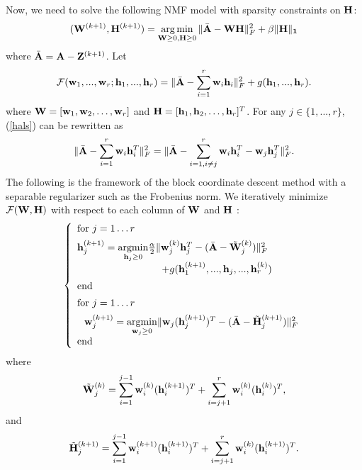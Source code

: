 Now, we need to solve the following NMF model with sparsity constraints on ${\bf H}$:
$$
({\bf W}^{(k+1)},{\bf H}^{(k+1)}) = \mathop{\rm arg\,min}_{{\bf W} \ge 0, {\bf H} \ge 0}  \|\bar{\bf A} - {\bf W}{\bf H}\|_F^2 + \beta \|\bf H\|_1
$$
where $\bar{\bf A} = {\bf A} - {\bf Z}^{(k+1)}$. Let
\begin{equation}\label{hals}
{\cal F}({\bf w}_1,...,{\bf w}_r;{\bf h}_1,...,{\bf h}_r) = \norm{\bar{\bf A} - \sum_{i=1}^r {\bf w}_i{\bf h}_i}_F^2 + g({\bf h}_1,...,{\bf h}_r).
\end{equation}
where ${\bf W} = [{\bf w}_1,{\bf w}_2,\dots,{\bf w}_r]$ and ${\bf H} = [{\bf h}_1, {\bf h}_2, \dots, {\bf h}_r]^T$. For any $j \in \{1,...,r\}$, (\ref{hals}) can be rewritten as
\begin{equation}\label{hals-1}
\|\bar{{\bf A}}-\sum_{i=1}^r{\bf w}_i{\bf h}_i^T\|^2_F=\|\bar{\bf A}-\sum_{i=1,i\not=j}^r {\bf w}_i{\bf h}_i^T-{\bf w}_j{\bf h}_j^T\|^2_F.
\end{equation}
The following is the framework of the  block coordinate descent
method with a separable regularizer such as the  Frobenius norm. We
iteratively minimize ${\cal F}({\bf W},{\bf H})$ with respect to
each column of ${\bf W}$ and ${\bf H}$ :
\begin{equation}
\left\{
  \begin{array}{ll}
  {\rm for}\ j=1 \dots r \\[5pt]
  {\bf h}_j^{(k+1)} = \underset{{\bf h}_j \ge 0}{\rm argmin} \frac{\alpha}{2}\norm{{\bf w}_j^{(k)}{\bf h}_j^T-(\bar{\bf A}-\tilde{\bf W}^{(k)}_j)}^2_F\\\hspace{3cm} + g({\bf h}_1^{(k+1)},...,{\bf h}_j,...,{\bf h}_r^{(k)}) \\[5pt]
  {\rm end}\\[5pt]
    {\rm for}\ j=1 \dots r \\[5pt]
  \hspace{0.25cm}{\bf w}_j^{(k+1)} = \underset{{\bf w}_j \ge 0}{\rm argmin} \norm{{\bf w}_j ({\bf h}_j^{(k+1)})^T -(\bar{\bf A}-\tilde{\bf H}^{(k+1)}_j)}^2_F \\[5pt]
  {\rm end}\\
\end{array}
\right.\label{halsalter}
\end{equation}
where
$$
\tilde{\bf W}^{(k)}_j = \sum_{i=1}^{j-1}{\bf w}_i^{(k)}({\bf h}_i^{(k+1)})^T + \sum_{i=j+1}^r{\bf w}_i^{(k)}({\bf h}_i^{(k)})^T,
$$
and
$$
\tilde{\bf H}^{(k+1)}_j = \sum_{i=1}^{j-1}{\bf w}_i^{(k+1)}({\bf h}_i^{(k+1)})^T + \sum_{i=j+1}^r{\bf w}_i^{(k)}({\bf h}_i^{(k+1)})^T.
$$

